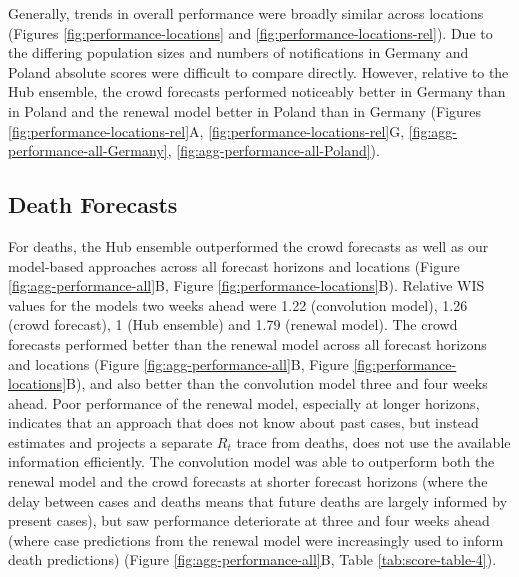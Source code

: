 \documentclass[10pt,letterpaper]{article}
\begin{document}
Generally, trends in overall performance were broadly similar across
locations (Figures \ref{fig:performance-locations} and
\ref{fig:performance-locations-rel}). Due to the differing population
sizes and numbers of notifications in Germany and Poland absolute scores
were difficult to compare directly. However, relative to the Hub
ensemble, the crowd forecasts performed noticeably better in Germany
than in Poland and the renewal model better in Poland than in Germany
(Figures \ref{fig:performance-locations-rel}A,
\ref{fig:performance-locations-rel}G,
\ref{fig:agg-performance-all-Germany},
\ref{fig:agg-performance-all-Poland}).

\hypertarget{death-forecasts}{%
\subsection{Death Forecasts}\label{death-forecasts}}

For deaths, the Hub ensemble outperformed the crowd forecasts as well as
our model-based approaches across all forecast horizons and locations
(Figure \ref{fig:agg-performance-all}B, Figure
\ref{fig:performance-locations}B). Relative WIS values for the models
two weeks ahead were 1.22 (convolution model), 1.26 (crowd forecast), 1
(Hub ensemble) and 1.79 (renewal model). The crowd forecasts performed
better than the renewal model across all forecast horizons and locations
(Figure \ref{fig:agg-performance-all}B, Figure
\ref{fig:performance-locations}B), and also better than the convolution
model three and four weeks ahead. Poor performance of the renewal model,
especially at longer horizons, indicates that an approach that does not
know about past cases, but instead estimates and projects a separate
\(R_t\) trace from deaths, does not use the available information
efficiently. The convolution model was able to outperform both the
renewal model and the crowd forecasts at shorter forecast horizons
(where the delay between cases and deaths means that future deaths are
largely informed by present cases), but saw performance deteriorate at
three and four weeks ahead (where case predictions from the renewal
model were increasingly used to inform death predictions) (Figure
\ref{fig:agg-performance-all}B, Table \ref{tab:score-table-4}).
\end{document}
